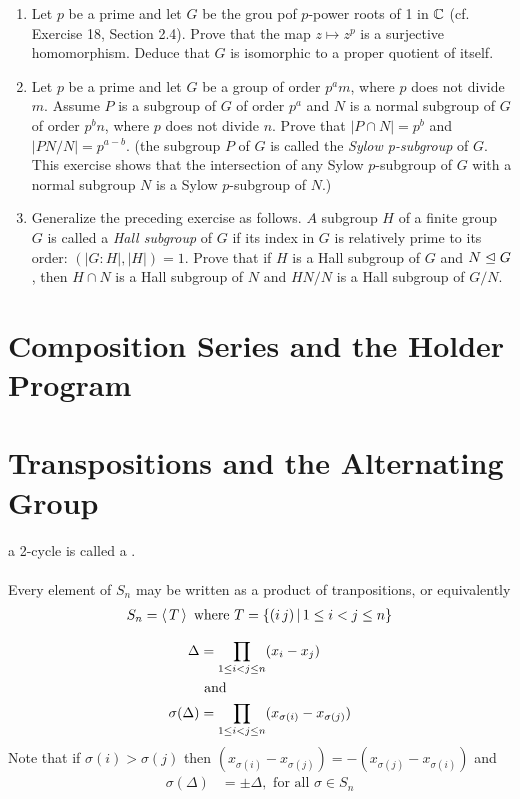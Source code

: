 \documentclass[10pt,a4paper]{report}
\begin{document}
\begin{enumerate}
\item Let $p$ be a prime and let $G$ be the grou pof $p$-power roots of 1 in $\mathbb{C}$ (cf. Exercise 18, Section 2.4).  Prove that the map $z \mapsto z^p$ is a surjective homomorphism.  Deduce that $G$ is isomorphic to a proper quotient of itself.

\item Let $p$ be a prime and let $G$ be a group of order $p^a m$, where $p$ does not divide $m$.  Assume $P$ is a subgroup of $G$ of order $p^a$ and $N$ is a normal subgroup of $G$ of order $p^b n$, where $p$ does not divide $n$.  Prove that $|P\cap N|=p^b$ and $|PN/N|=p^{a-b}$. (the subgroup $P$ of $G$ is called the \textit{Sylow p-subgroup} of $G$.  This exercise shows that the intersection of any Sylow $p$-subgroup of $G$ with a normal subgroup $N$ is a Sylow $p$-subgroup of $N$.)

\item Generalize the preceding exercise as follows.  $A$ subgroup $H$ of a finite group $G$ is called a \textit{Hall subgroup} of $G$ if its index in $G$ is relatively prime to its order:  $(|G:H|,|H|)=1$.  Prove that if $H$ is a Hall subgroup of $G$ and $N \trianglelefteq G$, then $H\cap N$ is a Hall subgroup of $N$ and $HN/N$ is a Hall subgroup of $G/N$.
\end{enumerate}

\section{Composition Series and the Holder Program}

\section{Transpositions and the Alternating Group}

\begin{definition}a 2-cycle is called a .\\
\\
Every element of $S_n$ may be written as a product of tranpositions, or equivalently
\begin{align*}
	S_n = \left \langle\, T \,\right \rangle \text{ where } T=\{(i\,j)\,|\,1\le i<j\le n\}
\end{align*}
\end{definition}

\begin{align*}
	\Delta &= \prod_{1\le i <j\le n} (x_i-x_j)  \\
	&\text{ and } \\
	\sigma(\Delta) &= \prod_{1\le i <j\le n} (x_{\sigma(i)}-x_{\sigma(j)})
\end{align*} Note that if $\sigma(i) > \sigma(j)$ then $(x_{\sigma(i)}-x_{\sigma(j)}) = -(x_{\sigma(j)}-x_{\sigma(i)})$ and 
\begin{align*}
	\sigma(\Delta) &= \pm \Delta, \text{ for all } \sigma \in S_n \\
\end{align*}
\end{document}
